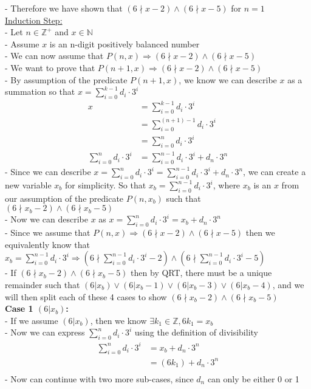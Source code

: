 \documentclass[20pt]{article}
\begin{document}
\begin{enumerate}
- Therefore we have shown that $(6\nmid x-2) \land (6\nmid x-5)$ for $n = 1$\\


\underline{Induction Step:}\\
- Let $n \in\mathbb{Z}^+$ and $x \in\mathbb{N}$\\
- Assume $x$ is an n-digit positively balanced number\\
- We can now assume that $P(n,x) \Rightarrow (6\nmid x-2) \land (6\nmid x-5)$\\
- We want to prove that $P(n+1,x) \Rightarrow (6\nmid x-2) \land (6\nmid x-5)$\\
- By assumption of the predicate $P(n+1,x)$, we know we can describe $x$ as a summation so that $x = \sum_{i = 0}^{k-1}d_i\cdot 3^i$
\begin{align*}
    x &= \sum_{i = 0}^{k-1}d_i\cdot 3^i\nonumber\\ 
    &= \sum_{i = 0}^{(n+1)-1}d_i\cdot 3^i\nonumber\tag{Since $k = n + 1$}\\
    &= \sum_{i = 0}^{n}d_i\cdot 3^i\nonumber\\
    \sum_{i = 0}^{n}d_i\cdot 3^i\nonumber &= \sum_{i = 0}^{n-1}d_i\cdot 3^i + d_n\cdot 3^n\nonumber
\end{align*}
- Since we can describe $x = \sum_{i = 0}^{n}d_i\cdot 3^i\nonumber = \sum_{i = 0}^{n-1}d_i\cdot 3^i + d_n\cdot 3^n\nonumber$, we can create a new variable $x_b$ for simplicity. So that $x_b = \sum_{i = 0}^{n-1}d_i\cdot 3^i$, where $x_b$ is an $x$ from our assumption of the predicate $P(n,x_b)$ such that $(6\nmid x_b-2) \land (6\nmid x_b-5)$\\
- Now we can describe $x$ as $x = \sum_{i = 0}^{n}d_i\cdot 3^i\nonumber = x_b + d_n\cdot 3^n\nonumber$\\
- Since we assume that $P(n,x) \Rightarrow (6\nmid x-2) \land (6\nmid x-5)$ then we equivalently know that $x_b = \sum_{i = 0}^{n-1}d_i\cdot 3^i \Rightarrow (6\nmid \sum_{i = 0}^{n-1}d_i\cdot 3^i-2) \land (6\nmid \sum_{i = 0}^{n-1}d_i\cdot 3^i-5)$\\
- If $(6\nmid x_b-2) \land (6\nmid x_b-5)$ then by QRT, there must be a unique remainder such that $(6|x_b) \lor (6|x_b-1) \lor (6|x_b-3) \lor (6|x_b-4)$, and we will then split each of these 4 cases to show $(6\nmid x_b-2) \land (6\nmid x_b-5)$\\


\textbf{Case 1 $(6|x_b)$:}\\
- If we assume $(6|x_b)$, then we know $\exists k_1\in\mathbb{Z}, 6k_1 = x_b$\\
- Now we can express $\sum_{i = 0}^{n}d_i\cdot 3^i\nonumber$ using the definition of divisibility
\begin{align*}
    \sum_{i = 0}^{n}d_i\cdot 3^i &= x_b + d_n\cdot 3^n\nonumber\\
    &= (6k_1) + d_n\cdot 3^n\nonumber\\
\end{align*}
- Now can continue with two more sub-cases, since $d_n$ can only be either 0 or 1 \\


\end{enumerate}
\end{document}
